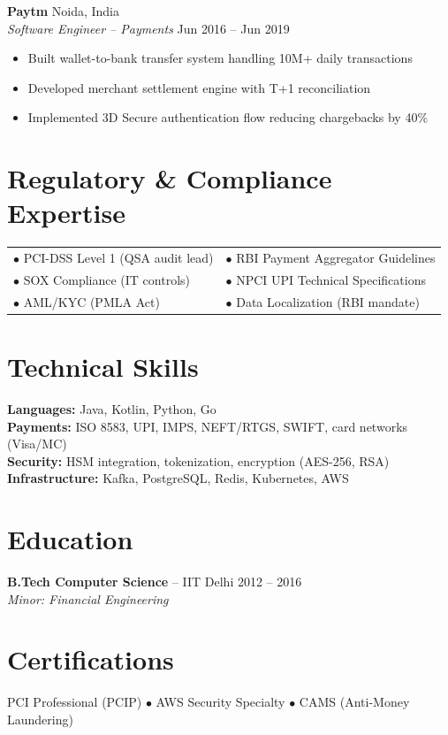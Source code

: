 \documentclass[11pt,letterpaper]{article}
\begin{document}
\textbf{Paytm} \hfill Noida, India\\
\textit{Software Engineer -- Payments} \hfill Jun 2016 -- Jun 2019
\begin{itemize}
\item Built wallet-to-bank transfer system handling 10M+ daily transactions
\item Developed merchant settlement engine with T+1 reconciliation
\item Implemented 3D Secure authentication flow reducing chargebacks by 40\%
\end{itemize}

\section{Regulatory \& Compliance Expertise}
\begin{tabularx}{\linewidth}{@{}XX@{}}
$\bullet$ PCI-DSS Level 1 (QSA audit lead) & $\bullet$ RBI Payment Aggregator Guidelines\\
$\bullet$ SOX Compliance (IT controls) & $\bullet$ NPCI UPI Technical Specifications\\
$\bullet$ AML/KYC (PMLA Act) & $\bullet$ Data Localization (RBI mandate)\\
\end{tabularx}

\section{Technical Skills}
\textbf{Languages:} Java, Kotlin, Python, Go\\
\textbf{Payments:} ISO 8583, UPI, IMPS, NEFT/RTGS, SWIFT, card networks (Visa/MC)\\
\textbf{Security:} HSM integration, tokenization, encryption (AES-256, RSA)\\
\textbf{Infrastructure:} Kafka, PostgreSQL, Redis, Kubernetes, AWS

\section{Education}
\textbf{B.Tech Computer Science} -- IIT Delhi \hfill 2012 -- 2016\\
\textit{Minor: Financial Engineering}

\section{Certifications}
PCI Professional (PCIP) \quad $\bullet$ \quad AWS Security Specialty \quad $\bullet$ \quad CAMS (Anti-Money Laundering)
\end{document}
